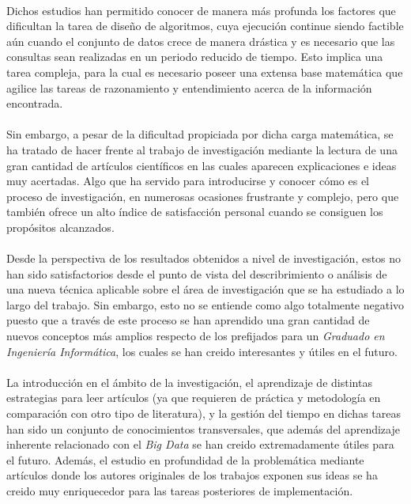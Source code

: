 \documentclass{subfiles}
\begin{document}
      \paragraph{}
      Dichos estudios han permitido conocer de manera más profunda los factores que dificultan la tarea de diseño de algoritmos, cuya ejecución continue siendo factible aún cuando el conjunto de datos crece de manera drástica y es necesario que las consultas sean realizadas en un periodo reducido de tiempo. Esto implica una tarea compleja, para la cual es necesario poseer una extensa base matemática que agilice las tareas de razonamiento y entendimiento acerca de la información encontrada.

      \paragraph{}
      Sin embargo, a pesar de la dificultad propiciada por dicha carga matemática, se ha tratado de hacer frente al trabajo de investigación mediante la lectura de una gran cantidad de artículos científicos en las cuales aparecen explicaciones e ideas muy acertadas. Algo que ha servido para introducirse y conocer cómo es el proceso de investigación, en numerosas ocasiones frustrante y complejo, pero que también ofrece un alto índice de satisfacción personal cuando se consiguen los propósitos alcanzados.

      \paragraph{}
      Desde la perspectiva de los resultados obtenidos a nivel de investigación, estos no han sido satisfactorios desde el punto de vista del describrimiento o análisis de una nueva técnica aplicable sobre el área de investigación que se ha estudiado a lo largo del trabajo. Sin embargo, esto no se entiende como algo totalmente negativo puesto que a través de este proceso se han aprendido una gran cantidad de nuevos conceptos más amplios respecto de los prefijados para un \emph{Graduado en Ingeniería Informática}, los cuales se han creido interesantes y útiles en el futuro.

      \paragraph{}
      La introducción en el ámbito de la investigación, el aprendizaje de distintas estrategias para leer artículos (ya que requieren de práctica y metodología en comparación con otro tipo de literatura), y la gestión del tiempo en dichas tareas han sido un conjunto de conocimientos transversales, que además del aprendizaje inherente relacionado con el \emph{Big Data} se han creido extremadamente útiles para el futuro. Además, el estudio en profundidad de la problemática mediante artículos donde los autores originales de los trabajos exponen sus ideas se ha creido muy enriquecedor para las tareas posteriores de implementación.
\end{document}
